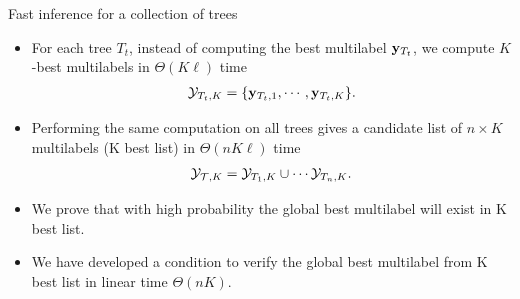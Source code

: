 \documentclass[first=dgreen,second=purple,logo=red]{aaltoslides}
\begin{document}
%
\begin{frame}[allowframebreaks]{Fast inference for a collection of trees}
	\begin{itemize}
		\item For each tree $T_t$, instead of computing the best multilabel $\mathbf {y}_{T_t}$, we compute $K$-best multilabels in $\Theta(K\ell)$ time
		\begin{align*}
			\mathcal{Y}_{T_t,K} = \{\mathbf {y}_{T_t,1},\cdots,\mathbf {y}_{T_t,K}\}.
		\end{align*}
		\item Performing the same computation on all trees gives a candidate list of $n\times K$ multilabels (K best list) in $\Theta(nK\ell)$ time
		\begin{align*}
			\mathcal{Y}_{\mathcal{T},K}=\mathcal{Y}_{T_1,K}\cup\cdots\mathcal{Y}_{T_n,K}.
		\end{align*}
		\item We prove that with high probability the global best multilabel will exist in K best list.
		\item We have developed a condition to verify the global best multilabel from K best list in linear time $\Theta(nK)$.
	\end{itemize}
\end{frame}
\end{document}
